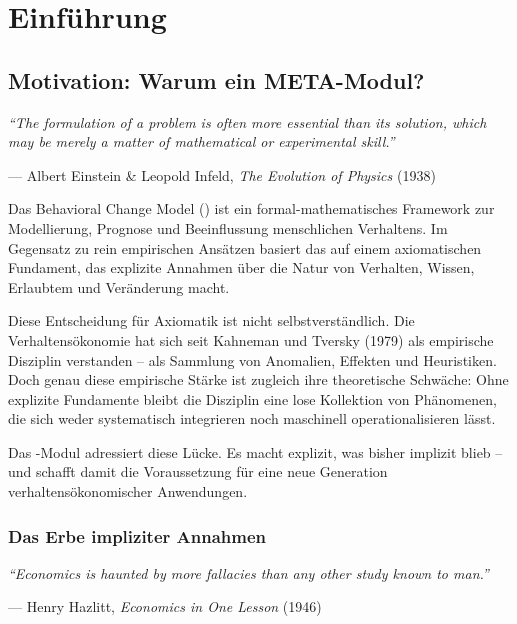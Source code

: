 \section{Einführung}

\subsection{Motivation: Warum ein META-Modul?}

\epigraph{\textit{``The formulation of a problem is often more essential than its solution, which may be merely a matter of mathematical or experimental skill.''}}{--- Albert Einstein \& Leopold Infeld, \textit{The Evolution of Physics} (1938)}

Das Behavioral Change Model (\BCM) ist ein formal-mathematisches Framework zur Modellierung, Prognose und Beeinflussung menschlichen Verhaltens. Im Gegensatz zu rein empirischen Ansätzen basiert das \BCM{} auf einem axiomatischen Fundament, das explizite Annahmen über die Natur von Verhalten, Wissen, Erlaubtem und Veränderung macht.

Diese Entscheidung für Axiomatik ist nicht selbstverständlich. Die Verhaltensökonomie hat sich seit Kahneman und Tversky (1979) als empirische Disziplin verstanden -- als Sammlung von Anomalien, Effekten und Heuristiken. Doch genau diese empirische Stärke ist zugleich ihre theoretische Schwäche: Ohne explizite Fundamente bleibt die Disziplin eine lose Kollektion von Phänomenen, die sich weder systematisch integrieren noch maschinell operationalisieren lässt.

Das \META-Modul adressiert diese Lücke. Es macht explizit, was bisher implizit blieb -- und schafft damit die Voraussetzung für eine neue Generation verhaltensökonomischer Anwendungen.

\subsubsection{Das Erbe impliziter Annahmen}

\epigraph{\textit{``Economics is haunted by more fallacies than any other study known to man.''}}{--- Henry Hazlitt, \textit{Economics in One Lesson} (1946)}

